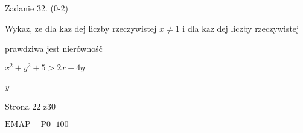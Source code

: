 \documentclass[a4paper,12pt]{article}
\begin{document}
Zadanie 32. (0-2)

Wykaz, $\dot{\mathrm{z}}\mathrm{e}$ dla $\mathrm{k}\mathrm{a}\dot{\mathrm{z}}$ dej liczby rzeczywistej $x\neq 1$ i dla $\mathrm{k}\mathrm{a}\dot{\mathrm{z}}$ dej liczby rzeczywistej

prawdziwa jest nierównośč

$x^{2}+y^{2}+5>2x+4y$

{\it y}

Strona 22 z30

$\mathrm{E}\mathrm{M}\mathrm{A}\mathrm{P}-\mathrm{P}0_{-}100$
\end{document}

